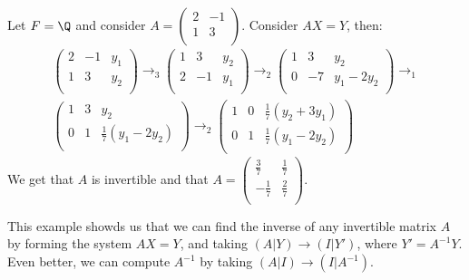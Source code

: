 \begin{example}
    Let $F=\Q$ and consider  $A=\begin{pmatrix} 2 & -1 \\ 1 & 3 \\ \end{pmatrix}$. Consider $AX=Y$,
    then:
        \begin{align*}
            \begin{pmatrix}
                2 & -1 & y_1 \\
                1 & 3 & y_2 \\
            \end{pmatrix} \rightarrow_3
            \begin{pmatrix}
                1 & 3 & y_2 \\
                2 & -1 & y_1 \\
            \end{pmatrix} \rightarrow_2
            \begin{pmatrix}
                1 & 3 & y_2 \\
                0 & -7 & y_1-2y_2 \\
            \end{pmatrix} \rightarrow_1 \\
            \begin{pmatrix}
                1 & 3 & y_2 \\
                0 & 1 & \frac{1}{7}(y_1-2y_2) \\
            \end{pmatrix} \rightarrow_2
            \begin{pmatrix}
                1 & 0 & \frac{1}{7}(y_2+3y_1) \\
                0 & 1 & \frac{1}{7}(y_1-2y_2) \\
            \end{pmatrix}
        \end{align*}
    We get that $A$ is invertible and that $A=\begin{pmatrix} \frac{3}{7} & \frac{1}{7}
    \\ -\frac{1}{7} & \frac{2}{7} \\ \end{pmatrix}$.
\end{example}

This example showds us that we can find the inverse of any invertible matrix $A$ by forming the
system  $AX=Y$, and taking  $(A|Y) \rightarrow (I|Y')$, where $Y'=A^{-1}Y$. Even better, we can
compute $A^{-1}$ by taking $(A|I) \rightarrow (I|A^{-1})$.
